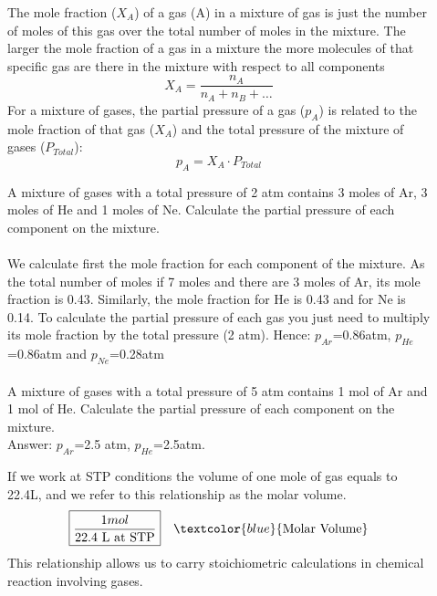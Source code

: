\documentclass[main.tex]{subfiles}
\begin{document}
\begin{description}
\item[] The mole fraction ($X_A$) of a gas (A) in a mixture of gas is just the number of moles of this gas over the total number of moles in the mixture. The larger the mole fraction of a gas in a mixture the more molecules of that specific gas are there in the mixture with respect to all components
\begin{equation*}
\boxed{  X_A = \frac{n_A}{n_A + n_B + \dots} }
\end{equation*}
For a mixture of gases, the partial pressure of a gas ($p_A$) is related to the mole fraction of that gas ($X_A$) and the total pressure of the mixture of gases ($P_{Total}$):
\begin{equation*}
\boxed{  p_A=X_A\cdot P_{Total}}
\end{equation*}
\begin{example} %
A mixture of gases with a total pressure of 2 atm contains 3 moles of Ar, 3 moles of He and 1 moles of Ne. Calculate the partial pressure of each component on the mixture. 
\\
\\
We calculate first the mole fraction for each component of the mixture. As the total number of moles if 7 moles and there are 3 moles of Ar, its mole fraction is 0.43. Similarly, the mole fraction for He is 0.43 and for Ne is 0.14. To calculate the partial pressure of each gas you just need to multiply its mole fraction by the total pressure (2 atm). Hence: $p_{Ar}$=0.86atm, $p_{He}$=0.86atm and $p_{Ne}$=0.28atm
\\
\faDiamond\ \\
A mixture of gases with a total pressure of 5 atm contains 1 mol of Ar and 1 mol of He. Calculate the partial pressure of each component on the mixture. 
\\
\flushright Answer: $p_{Ar}$=2.5 atm, $p_{He}$=2.5atm.
\end{example}%
\item[] 
If we work at STP conditions the volume of one mole of gas equals to 22.4L, and we refer to this relationship as the molar volume.
\begin{equation*}
\boxed{  \frac{1 mol} {22.4\text{ L at STP}} } \quad \textcolor{blue}{\text{Molar Volume}}
\end{equation*}
This relationship allows us to carry stoichiometric calculations in chemical reaction involving gases.



\end{description}
\end{document}
